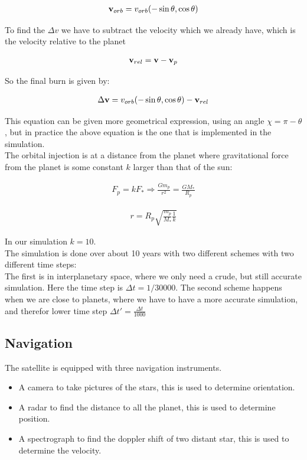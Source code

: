 \documentclass[a4paper, 10pt]{article}
\begin{document}
\begin{align}
\bold{v}_{orb} = v_{orb}(-\sin\theta,\cos\theta)
\end{align}

To find the $\Delta v$ we have to subtract the velocity which we already have, which is the velocity relative to the planet

\begin{align}
\bold{v}_{rel} = \bold{v} - \bold{v}_p
\end{align} 

So the final burn is given by:

\begin{align}
\Delta \bold{v} = v_{orb}(-\sin\theta,\cos\theta) - \bold{v}_{rel}
\end{align}

This equation can be given more geometrical expression, using an angle $\chi = \pi - \theta$, but in practice the above equation is the one that is implemented in the simulation.\\

The orbital injection is at a distance from the planet where gravitational force from the planet is some constant $k$ larger than that of the sun:

\begin{align}
F_p = kF_* \Rightarrow \frac{Gm_p}{r^2} = \frac{GM_*}{R_p}
\end{align}

\begin{align}
r = R_p\sqrt{\frac{m_p}{M_*}\frac{1}{k}}
\end{align}

In our simulation $k = 10$. \\

The simulation is done over about 10 years with two different schemes with two different time steps:\\
The first is in interplanetary space, where we only need a crude, but still accurate simulation. Here the time step is $\Delta t = 1/30000$. The second scheme happens when we are close to planets, where we have to have a more accurate simulation, and therefor lower time step $\Delta t' =\frac{\Delta t}{1000}$


\subsection{Navigation}
The satellite is equipped with three navigation instruments.

\begin{itemize}
\item A camera to take pictures of the stars, this is used to determine orientation.
\item A radar to find the distance to all the planet, this is used to determine position.
\item A spectrograph to find the doppler shift of two distant star, this is used to determine the velocity. 
\end{itemize}
\end{document}
